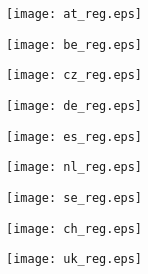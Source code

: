 \documentclass[a4paper, 12pt]{article}
\begin{document}
\clearpage


\begin{landscape}




\end{landscape}

\clearpage 


\begin{figure}[ht]
	\centering
		\texttt{[image: at\_reg.eps]}
\end{figure}

\begin{figure}[ht]
	\centering
		\texttt{[image: be\_reg.eps]}
\end{figure}

\begin{figure}[ht]
	\centering
		\texttt{[image: cz\_reg.eps]}
\end{figure}

\begin{figure}[ht]
	\centering
		\texttt{[image: de\_reg.eps]}
\end{figure}

\begin{figure}[ht]
	\centering
		\texttt{[image: es\_reg.eps]}
\end{figure}

\begin{figure}[ht]
	\centering
		\texttt{[image: nl\_reg.eps]}
\end{figure}

\begin{figure}[ht]
	\centering
		\texttt{[image: se\_reg.eps]}
\end{figure}

\begin{figure}[ht]
	\centering
		\texttt{[image: ch\_reg.eps]}
\end{figure}

\begin{figure}[ht]
	\centering
		\texttt{[image: uk\_reg.eps]}
\end{figure}



\end{document}
